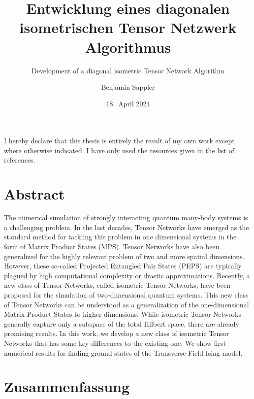 \documentclass[encoding=utf8,british]{template/thesis}
\title{Entwicklung eines diagonalen isometrischen Tensor Netzwerk Algorithmus}
\subtitle{Development of a diagonal isometric Tensor Network Algorithm}
\author{Benjamin Sappler}
\date{18.~April 2024}
\begin{document}
	\frontmatter
	\maketitle
	
	\newpage
	\thispagestyle{empty}
	
	\null\vfill
	\raggedright\noindent
	I hereby declare that this thesis is entirely the result of my own work except where otherwise indicated. I have only used the resources given in the list of references. \par
	\vspace{2cm}
	\noindent
	\par
	
	\newpage
	\thispagestyle{empty}
	
	\section*{Abstract}
	The numerical simulation of strongly interacting quantum many-body systems is a challenging problem. In the last decades, Tensor Networks have emerged as the standard method for tackling this problem in one dimensional systems in the form of Matrix Product States (MPS). Tensor Networks have also been generalized for the highly relevant problem of two and more spatial dimensions. However, these so-called Projected Entangled Pair States (PEPS) are typically plagued by high computational complexity or drastic approximations. Recently, a new class of Tensor Networks, called isometric Tensor Networks, have been proposed for the simulation of two-dimensional quantum systems. This new class of Tensor Networks can be understood as a generalization of the one-dimensional Matrix Product States to higher dimensions. While isometric Tensor Networks generally capture only a subspace of the total Hilbert space, there are already promising results. In this work, we develop a new class of isometric Tensor Networks that has some key differences to the existing one. We show first numerical results for finding ground states of the Transverse Field Ising model.
	
	\section*{Zusammenfassung}
	
	\tableofcontents
	
	\mainmatter
	\justifying
	
\end{document}
